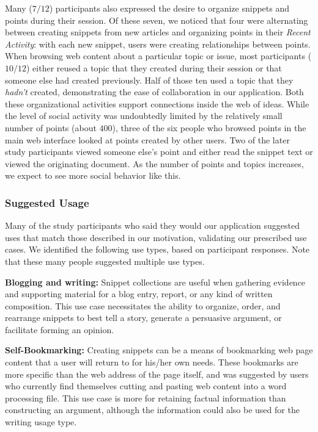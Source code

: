 \documentclass{chi2009}
\begin{document}
Many ($7/12$) participants also expressed the desire to organize snippets and points during their session. Of these seven, we noticed that four were alternating between creating snippets from new articles and organizing points in their {\it Recent Activity}: with each new snippet, users were creating relationships between points. When browsing web content about a particular topic or issue, most participants ($10/12$) either reused a topic that they created during their session or that someone else had created previously. Half of those ten used a topic that they {\it hadn't} created, demonstrating the ease of collaboration in our application. Both these organizational activities support connections inside the web of ideas. While the level of social activity was undoubtedly limited by the relatively small number of points (about $400$), three of the six people who browsed points in the main web interface looked at points created by other users. Two of the later study participants viewed someone else's point and either read the snippet text or viewed the originating document. As the number of points and topics increases, we expect to see more social behavior like this.


\subsubsection{Suggested Usage}
Many of the study participants who said they would our application suggested uses that match those described in our motivation, validating our prescribed use cases.  We identified the following use types, based on participant responses. Note that these many people suggested multiple use types.

\textbf{Blogging and writing:} Snippet collections are useful when gathering evidence and supporting material for a blog entry, report, or any kind of written composition. This use case necessitates the ability to organize, order, and rearrange snippets to best tell a story, generate a persuasive argument, or facilitate forming an opinion.

\textbf{Self-Bookmarking:} Creating snippets can be a means of bookmarking web page content that a user will return to for his/her own needs. These bookmarks are more specific than the web address of the page itself, and was suggested by users who currently find themselves cutting and pasting web content into a word processing file. This use case is more for retaining factual information than constructing an argument, although the information could also be used for the writing usage type.
\end{document}
